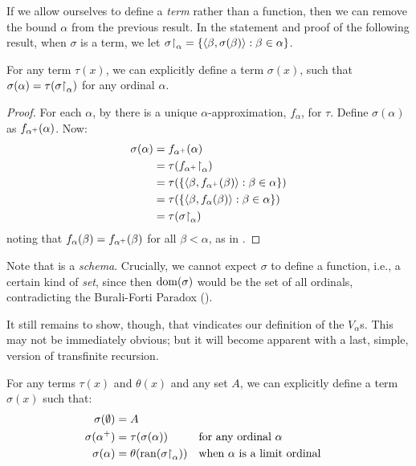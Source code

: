 \documentclass[../../../include/open-logic-section]{subfiles}
\begin{document}
If we allow ourselves to define a \emph{term} rather than a function,
then we can remove the bound $\alpha$ from the previous result. In
the statement and proof of the following result, when $\sigma$ is a term, we
let $\sigma\mathord{\restriction}_{\alpha} = \{ \langle \beta,
\sigma(\beta) \rangle : \beta \in \alpha \}$.

\begin{thm}
For any term $\tau(x)$, we can explicitly define a term
$\sigma(x)$, such that
$\sigma(\alpha) = \tau(\sigma\mathord{\restriction}_{\alpha})$ for any
ordinal $\alpha$. 	
\end{thm}

\begin{proof}
For each $\alpha$, by  there is a unique $\alpha$-approximation, $f_\alpha$, for $\tau$. Define $\sigma(\alpha)$ as $f_{\alpha^{+}}(\alpha)$. Now:
	\begin{align*}
		\sigma(\alpha) &= 
		f_{\ordsucc{\alpha}}(\alpha) \\&= 
		\tau(\funrestrictionto{f_{\ordsucc{\alpha}}}{\alpha}) \\&= 
		\tau(\Setabs{\tuple{\beta, f_{\ordsucc{\alpha}}(\beta)}}{\beta \in \alpha}) \\&= 
		\tau(\Setabs{\tuple{\beta, f_{\alpha}(\beta)}}{\beta \in \alpha})\\&=
		\tau(\funrestrictionto{\sigma}{\alpha})
	\end{align*}
noting that $f_{\alpha}(\beta) = f_{\alpha^{+}}(\beta)$ for all $\beta < \alpha$, as in . 
\end{proof}
\noindent 
Note that  is a \emph{schema}. Crucially, we cannot
expect $\sigma$ to define a function, i.e., a certain kind of
\emph{set}, since then $\mathrm{dom}(\sigma)$ would be the set of all
ordinals, contradicting the Burali-Forti Paradox
().

It still remains to show, though, that 
vindicates our definition of the $V_\alpha$s. This may not be
immediately obvious; but it will become apparent with a last, simple,
version of transfinite recursion.

\begin{thm} 
For any terms $\tau(x)$ and $\theta(x)$ and any set $A$, we can
explicitly define a term $\sigma(x)$ such that:
\begin{align*}
	\sigma(\emptyset) &= A\\
	\sigma(\ordsucc{\alpha}) &= \tau(\sigma(\alpha)) &&
		\text{for any ordinal }\alpha\\
	\sigma(\alpha) &= \theta(\ran{\funrestrictionto{\sigma}{\alpha}})&&
	\text{when }\alpha\text{ is a limit ordinal}
\end{align*}
\end{thm}
\end{document}
